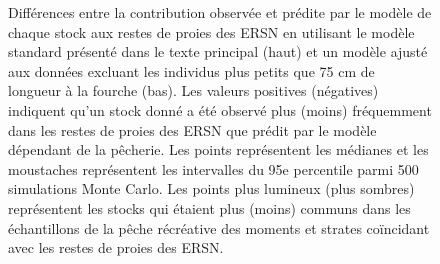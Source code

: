 \begin{figure}[H]
    \centering
    \caption{Différences entre la contribution observée et prédite par le modèle de chaque stock aux restes de proies des ERSN en utilisant le modèle standard présenté dans le texte principal (haut) et un modèle ajusté aux données excluant les individus plus petits que 75 cm de longueur à la fourche (bas). Les valeurs positives (négatives) indiquent qu'un stock donné a été observé plus (moins) fréquemment dans les restes de proies des ERSN que prédit par le modèle dépendant de la pêcherie. Les points représentent les médianes et les moustaches représentent les intervalles du 95e percentile parmi 500 simulations Monte Carlo. Les points plus lumineux (plus sombres) représentent les stocks qui étaient plus (moins) communs dans les échantillons de la pêche récréative des moments et strates coïncidant avec les restes de proies des ERSN.}
    \label{fig:comb-sel-stock}
\end{figure}

